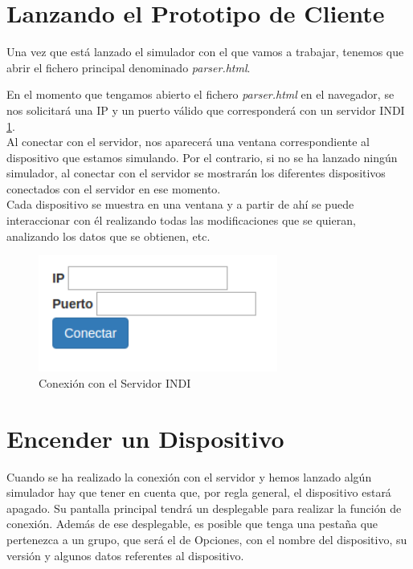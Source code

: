 \section{Lanzando el Prototipo de Cliente}
Una vez que está lanzado el simulador con el que vamos a trabajar, tenemos que abrir el fichero principal denominado \textit{parser.html}.

En el momento que tengamos abierto el fichero \textit{parser.html} en el navegador, se nos solicitará una IP y un puerto válido que corresponderá con un servidor INDI \ref{fig:conexionINDI}.\\

Al conectar con el servidor, nos aparecerá una ventana correspondiente al dispositivo que estamos simulando. Por el contrario, si no se ha lanzado ningún simulador, al conectar con el servidor se mostrarán los diferentes dispositivos conectados con el servidor en ese momento. \\

Cada dispositivo se muestra en una ventana y a partir de ahí se puede interaccionar con él realizando todas las modificaciones que se quieran, analizando los datos que se obtienen, etc.
\begin{figure}[htb]
\centering
\includegraphics[width=0.7\textwidth]{./imagenes/capturaConexion}
\caption{Conexión con el Servidor INDI} \label{fig:conexionINDI}
\end{figure}

\section{Encender un Dispositivo}
Cuando se ha realizado la conexión con el servidor y hemos lanzado algún simulador hay que tener en cuenta que, por regla general, el dispositivo estará apagado. Su pantalla principal tendrá un desplegable para realizar la función de conexión. Además de ese desplegable, es posible que tenga una pestaña que pertenezca a un grupo, que será el de Opciones, con el nombre del dispositivo, su versión y algunos datos referentes al dispositivo. \\


